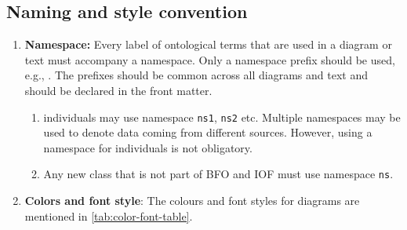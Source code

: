 \subsection*{Naming and style convention}

\begin{enumerate}
    \item \textbf{Namespace:} Every label of ontological terms that are used in a diagram or text must accompany a namespace. Only a namespace prefix should be used, e.g., . The prefixes should be common across all diagrams and text and should be declared in the front matter. 
        \begin{enumerate}
            \item individuals may use namespace \texttt{ns1}, \texttt{ns2} etc. Multiple namespaces may be used to denote data coming from different sources. However, using a namespace for individuals is not obligatory. 
            \item Any new class that is not part of BFO and IOF must use namespace \texttt{ns}.
        \end{enumerate}

    \item \textbf{Colors and font style}: The colours and font styles for diagrams are mentioned in \cref{tab:color-font-table}. 
    
\begin{table}[]
\caption{Colors and fonts}
\label{tab:color-font-table}
\end{table}


\end{enumerate}
